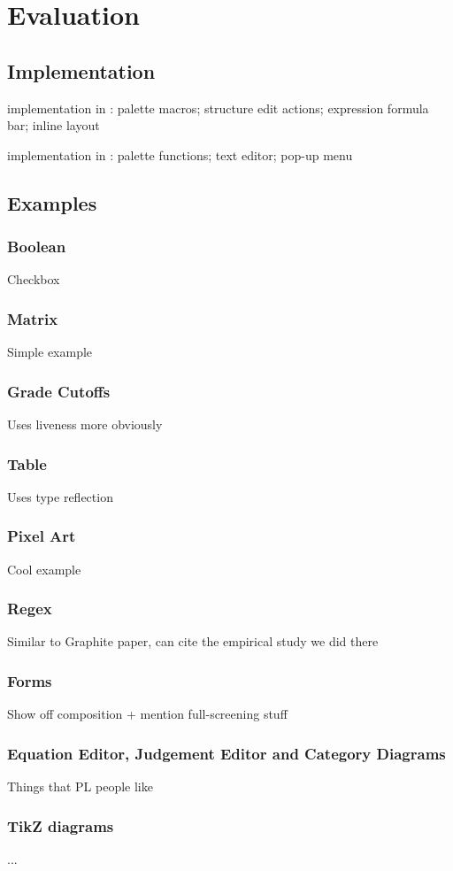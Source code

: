 \section{Evaluation}

\subsection{Implementation}

implementation in \Hazel{}: palette macros; structure edit actions; expression formula bar; inline layout

implementation in \sns{}: palette functions; text editor; pop-up menu

\subsection{Examples}


\subsubsection{Boolean}
Checkbox

\subsubsection{Matrix}
Simple example

\subsubsection{Grade Cutoffs}
Uses liveness more obviously

\subsubsection{Table}
Uses type reflection

\subsubsection{Pixel Art}
Cool example

\subsubsection{Regex}
Similar to Graphite paper, can cite the empirical study we did there

\subsubsection{Forms}
Show off composition + mention full-screening stuff

\subsubsection{Equation Editor, Judgement Editor and Category Diagrams}
Things that PL people like 

\subsubsection{TikZ diagrams}
...

